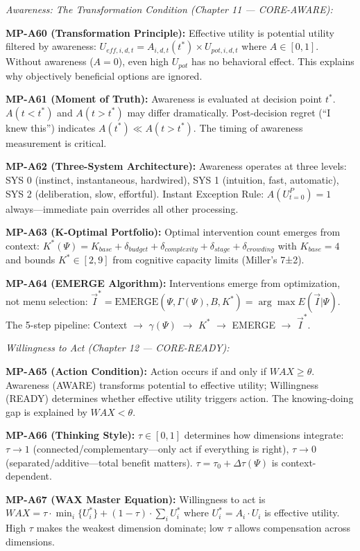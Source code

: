\begin{tcolorbox}[colback=gray!5!white, colframe=gray!75!black,
    title=\textbf{MP Axioms}]
\medskip
\textit{Awareness: The Transformation Condition (Chapter 11 --- CORE-AWARE):}

\textbf{MP-A60 (Transformation Principle):} Effective utility is potential utility filtered by awareness: $U_{eff,i,d,t} = A_{i,d,t}(t^*) \times U_{pot,i,d,t}$ where $A \in [0,1]$. Without awareness ($A = 0$), even high $U_{pot}$ has no behavioral effect. This explains why objectively beneficial options are ignored.

\textbf{MP-A61 (Moment of Truth):} Awareness is evaluated at decision point $t^*$. $A(t < t^*)$ and $A(t > t^*)$ may differ dramatically. Post-decision regret (``I knew this'') indicates $A(t^*) \ll A(t > t^*)$. The timing of awareness measurement is critical.

\textbf{MP-A62 (Three-System Architecture):} Awareness operates at three levels: SYS 0 (instinct, instantaneous, hardwired), SYS 1 (intuition, fast, automatic), SYS 2 (deliberation, slow, effortful). Instant Exception Rule: $A(U^P_{t=0}) = 1$ always---immediate pain overrides all other processing.

\textbf{MP-A63 (K-Optimal Portfolio):} Optimal intervention count emerges from context: $K^*(\Psi) = K_{base} + \delta_{budget} + \delta_{complexity} + \delta_{stage} + \delta_{crowding}$ with $K_{base} = 4$ and bounds $K^* \in [2, 9]$ from cognitive capacity limits (Miller's 7±2).

\textbf{MP-A64 (EMERGE Algorithm):} Interventions emerge from optimization, not menu selection: $\vec{I}^* = \text{EMERGE}(\Psi, \Gamma(\Psi), B, K^*) = \arg\max E(\vec{I} | \Psi)$. The 5-step pipeline: Context $\to$ $\gamma(\Psi)$ $\to$ $K^*$ $\to$ EMERGE $\to$ $\vec{I}^*$.

\medskip
\textit{Willingness to Act (Chapter 12 --- CORE-READY):}

\textbf{MP-A65 (Action Condition):} Action occurs if and only if $WAX \geq \theta$. Awareness (AWARE) transforms potential to effective utility; Willingness (READY) determines whether effective utility triggers action. The knowing-doing gap is explained by $WAX < \theta$.

\textbf{MP-A66 (Thinking Style):} $\tau \in [0,1]$ determines how dimensions integrate: $\tau \to 1$ (connected/complementary---only act if everything is right), $\tau \to 0$ (separated/additive---total benefit matters). $\tau = \tau_0 + \Delta\tau(\Psi)$ is context-dependent.

\textbf{MP-A67 (WAX Master Equation):} Willingness to act is $WAX = \tau \cdot \min_i\{U^*_i\} + (1-\tau) \cdot \sum_i U^*_i$ where $U^*_i = A_i \cdot U_i$ is effective utility. High $\tau$ makes the weakest dimension dominate; low $\tau$ allows compensation across dimensions.


\end{tcolorbox}
